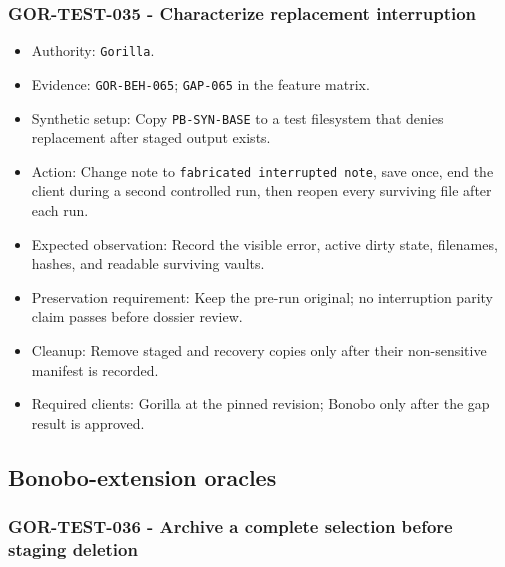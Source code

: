 \documentclass[
  letterpaper,
]{article}
\newcommand{\passthrough}[1]{#1}
\providecommand{\tightlist}{%
  \setlength{\itemsep}{0pt}\setlength{\parskip}{0pt}}
\begin{document}
\subsubsection{GOR-TEST-035 - Characterize replacement
interruption}\label{gor-test-035---characterize-replacement-interruption}

\begin{itemize}
\tightlist
\item
  Authority: \passthrough{\lstinline!Gorilla!}.
\item
  Evidence: \nolinkurl{GOR-BEH-065}; \passthrough{\lstinline!GAP-065!} in the feature matrix.
\item
  Synthetic setup: Copy \nolinkurl{PB-SYN-BASE} to a test filesystem that denies replacement after staged output exists.
\item
  Action: Change note to \passthrough{\lstinline!fabricated interrupted note!}, save once, end the client during a
  second controlled run, then reopen every surviving file after each run.
\item
  Expected observation: Record the visible error, active dirty state, filenames, hashes, and readable surviving vaults.
\item
  Preservation requirement: Keep the pre-run original; no interruption parity claim passes before dossier review.
\item
  Cleanup: Remove staged and recovery copies only after their non-sensitive manifest is recorded.
\item
  Required clients: Gorilla at the pinned revision; Bonobo only after the gap result is approved.
\end{itemize}

\subsection{Bonobo-extension oracles}\label{bonobo-extension-oracles}

\subsubsection{GOR-TEST-036 - Archive a complete selection before staging
deletion}\label{gor-test-036---archive-a-complete-selection-before-staging-deletion}
\end{document}
